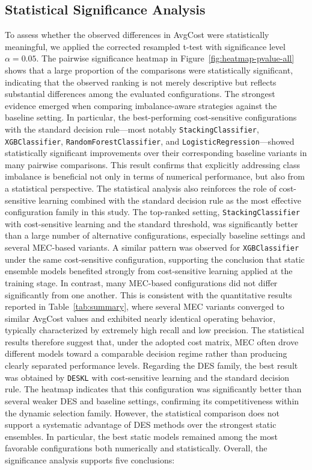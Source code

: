 \documentclass[conference]{IEEEtran}
\begin{document}
\subsection{Statistical Significance Analysis} 
To assess whether the observed differences in AvgCost were statistically meaningful, we applied the corrected resampled t-test with significance level \(\alpha = 0.05\). The pairwise significance heatmap in Figure~\ref{fig:heatmap-pvalue-all} shows that a large proportion of the comparisons were statistically significant, indicating that the observed ranking is not merely descriptive but reflects substantial differences among the evaluated configurations. The strongest evidence emerged when comparing imbalance-aware strategies against the baseline setting. In particular, the best-performing cost-sensitive configurations with the standard decision rule---most notably \texttt{StackingClassifier}, \texttt{XGBClassifier}, \texttt{RandomForestClassifier}, and \texttt{LogisticRegression}---showed statistically significant improvements over their corresponding baseline variants in many pairwise comparisons. This result confirms that explicitly addressing class imbalance is beneficial not only in terms of numerical performance, but also from a statistical perspective. The statistical analysis also reinforces the role of cost-sensitive learning combined with the standard decision rule as the most effective configuration family in this study. The top-ranked setting, \texttt{StackingClassifier} with cost-sensitive learning and the standard threshold, was significantly better than a large number of alternative configurations, especially baseline settings and several MEC-based variants. A similar pattern was observed for \texttt{XGBClassifier} under the same cost-sensitive configuration, supporting the conclusion that static ensemble models benefited strongly from cost-sensitive learning applied at the training stage. In contrast, many MEC-based configurations did not differ significantly from one another. This is consistent with the quantitative results reported in Table~\ref{tab:summary}, where several MEC variants converged to similar AvgCost values and exhibited nearly identical operating behavior, typically characterized by extremely high recall and low precision. The statistical results therefore suggest that, under the adopted cost matrix, MEC often drove different models toward a comparable decision regime rather than producing clearly separated performance levels. Regarding the DES family, the best result was obtained by \texttt{DESKL} with cost-sensitive learning and the standard decision rule. The heatmap indicates that this configuration was significantly better than several weaker DES and baseline settings, confirming its competitiveness within the dynamic selection family. However, the statistical comparison does not support a systematic advantage of DES methods over the strongest static ensembles. In particular, the best static models remained among the most favorable configurations both numerically and statistically. Overall, the significance analysis supports five conclusions:
\end{document}
